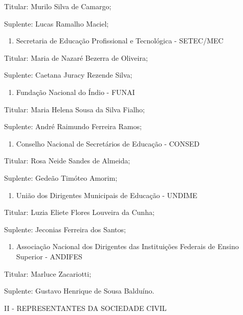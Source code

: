 \documentclass[
]{book}
\providecommand{\tightlist}{%
  \setlength{\itemsep}{0pt}\setlength{\parskip}{0pt}}
\begin{document}
Titular: Murilo Silva de Camargo;

Suplente: Lucas Ramalho Maciel;

\begin{enumerate}
\def\labelenumi{\alph{enumi})}
\setcounter{enumi}{3}
\tightlist
\item
  Secretaria de Educação Profissional e Tecnológica - SETEC/MEC
\end{enumerate}

Titular: Maria de Nazaré Bezerra de Oliveira;

Suplente: Caetana Juracy Rezende Silva;

\begin{enumerate}
\def\labelenumi{\alph{enumi})}
\setcounter{enumi}{4}
\tightlist
\item
  Fundação Nacional do Índio - FUNAI
\end{enumerate}

Titular: Maria Helena Sousa da Silva Fialho;

Suplente: André Raimundo Ferreira Ramos;

\begin{enumerate}
\def\labelenumi{\alph{enumi})}
\setcounter{enumi}{5}
\tightlist
\item
  Conselho Nacional de Secretários de Educação - CONSED
\end{enumerate}

Titular: Rosa Neide Sandes de Almeida;

Suplente: Gedeão Timóteo Amorim;

\begin{enumerate}
\def\labelenumi{\alph{enumi})}
\setcounter{enumi}{6}
\tightlist
\item
  União dos Dirigentes Municipais de Educação - UNDIME
\end{enumerate}

Titular: Luzia Eliete Flores Louveira da Cunha;

Suplente: Jeconias Ferreira dos Santos;

\begin{enumerate}
\def\labelenumi{\alph{enumi})}
\setcounter{enumi}{7}
\tightlist
\item
  Associação Nacional dos Dirigentes das Instituições Federais de Ensino Superior - ANDIFES
\end{enumerate}

Titular: Marluce Zacariotti;

Suplente: Gustavo Henrique de Sousa Balduíno.

II - REPRESENTANTES DA SOCIEDADE CIVIL
\end{document}
